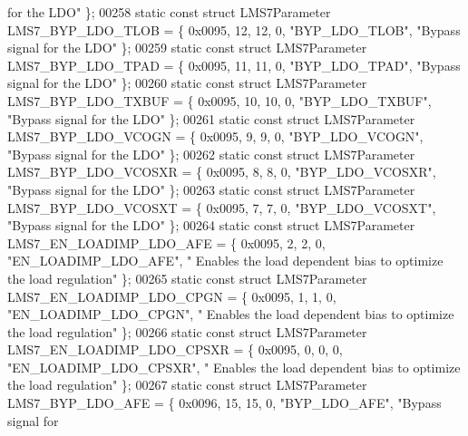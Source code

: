 \begin{DoxyCode}
{       for the LDO"} \};
00258 \textcolor{keyword}{static} \textcolor{keyword}{const} \textcolor{keyword}{struct }LMS7Parameter LMS7_BYP_LDO_TLOB = \{ 0x0095, 12, 12, 0, \textcolor{stringliteral}{"BYP\_LDO\_TLOB"}, \textcolor{stringliteral}{"Bypass signal
       for the LDO"} \};
00259 \textcolor{keyword}{static} \textcolor{keyword}{const} \textcolor{keyword}{struct }LMS7Parameter LMS7_BYP_LDO_TPAD = \{ 0x0095, 11, 11, 0, \textcolor{stringliteral}{"BYP\_LDO\_TPAD"}, \textcolor{stringliteral}{"Bypass signal
       for the LDO"} \};
00260 \textcolor{keyword}{static} \textcolor{keyword}{const} \textcolor{keyword}{struct }LMS7Parameter LMS7_BYP_LDO_TXBUF = \{ 0x0095, 10, 10, 0, \textcolor{stringliteral}{"BYP\_LDO\_TXBUF"}, \textcolor{stringliteral}{"Bypass signal
       for the LDO"} \};
00261 \textcolor{keyword}{static} \textcolor{keyword}{const} \textcolor{keyword}{struct }LMS7Parameter LMS7_BYP_LDO_VCOGN = \{ 0x0095, 9, 9, 0, \textcolor{stringliteral}{"BYP\_LDO\_VCOGN"}, \textcolor{stringliteral}{"Bypass signal
       for the LDO"} \};
00262 \textcolor{keyword}{static} \textcolor{keyword}{const} \textcolor{keyword}{struct }LMS7Parameter LMS7_BYP_LDO_VCOSXR = \{ 0x0095, 8, 8, 0, \textcolor{stringliteral}{"BYP\_LDO\_VCOSXR"}, \textcolor{stringliteral}{"Bypass signal
       for the LDO"} \};
00263 \textcolor{keyword}{static} \textcolor{keyword}{const} \textcolor{keyword}{struct }LMS7Parameter LMS7_BYP_LDO_VCOSXT = \{ 0x0095, 7, 7, 0, \textcolor{stringliteral}{"BYP\_LDO\_VCOSXT"}, \textcolor{stringliteral}{"Bypass signal
       for the LDO"} \};
00264 \textcolor{keyword}{static} \textcolor{keyword}{const} \textcolor{keyword}{struct }LMS7Parameter LMS7_EN_LOADIMP_LDO_AFE = \{ 0x0095, 2, 2, 0, \textcolor{stringliteral}{"EN\_LOADIMP\_LDO\_AFE"}, \textcolor{stringliteral}{"
      Enables the load dependent bias to optimize the load regulation"} \};
00265 \textcolor{keyword}{static} \textcolor{keyword}{const} \textcolor{keyword}{struct }LMS7Parameter LMS7_EN_LOADIMP_LDO_CPGN = \{ 0x0095, 1, 1, 0, \textcolor{stringliteral}{"EN\_LOADIMP\_LDO\_CPGN"}, \textcolor{stringliteral}{"
      Enables the load dependent bias to optimize the load regulation"} \};
00266 \textcolor{keyword}{static} \textcolor{keyword}{const} \textcolor{keyword}{struct }LMS7Parameter LMS7_EN_LOADIMP_LDO_CPSXR = \{ 0x0095, 0, 0, 0, \textcolor{stringliteral}{"EN\_LOADIMP\_LDO\_CPSXR"}, \textcolor{stringliteral}{"
      Enables the load dependent bias to optimize the load regulation"} \};
00267 \textcolor{keyword}{static} \textcolor{keyword}{const} \textcolor{keyword}{struct }LMS7Parameter LMS7_BYP_LDO_AFE = \{ 0x0096, 15, 15, 0, \textcolor{stringliteral}{"BYP\_LDO\_AFE"}, \textcolor{stringliteral}{"Bypass signal for
}
\end{DoxyCode}
